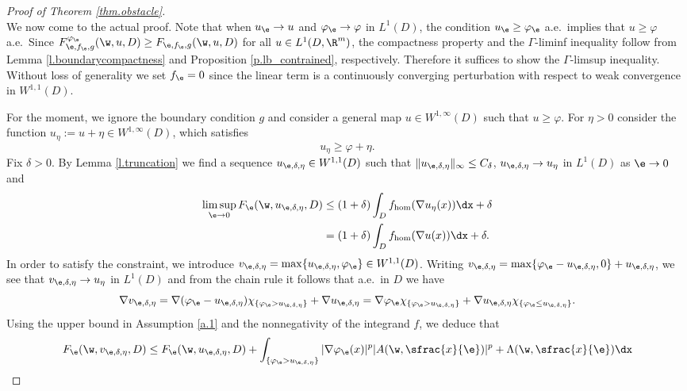 \begin{proof}[Proof of Theorem \ref{thm.obstacle}]
\begin{equation}
\end{equation}
We now come to the actual proof. Note that when $u_{\e}\to u$ and $\varphi_{\e}\to\varphi$ in $L^1(D)$, the condition $u_{\e}\geq \varphi_{\e}$ a.e.\ implies that $u\geq\varphi$ a.e.\ Since $F_{\e,f_{\e},g}^{\varphi_{\e}}(\w,u,D)\geq F_{\e,f_{\e},g}(\w,u,D)$ for all $u\in L^1(D,\R^m)$, the compactness property and the $\Gamma$-liminf inequality follow from Lemma \ref{l.boundarycompactness} and Proposition \ref{p.lb_contrained}, respectively. Therefore it suffices to show the $\Gamma$-limsup inequality. Without loss of generality we set $f_{\e}=0$ since the linear term is a continuously converging perturbation with respect to weak convergence in $W^{1,1}(D)$.

For the moment, we ignore the boundary condition $g$ and consider a general map $u\in W^{1,\infty}(D)$ such that $u\geq \varphi$. For $\eta>0$ consider the function $u_{\eta}:=u+\eta\in W^{1,\infty}(D)$, which satisfies
\begin{equation}\label{eq:eta_barrier}
u_{\eta}\geq \varphi+\eta.
\end{equation}
Fix $\delta>0$. By Lemma \ref{l.truncation} we find a sequence $u_{\e,\delta,\eta}\in W^{1,1}(D)$ such that $\|u_{\e,\delta,\eta}\|_{\infty}\leq C_{\delta}$, $u_{\e,\delta,\eta}\to u_{\eta}$ in $L^1(D)$ as $\e\to 0$ and
\begin{align*}
\limsup_{\e\to 0}F_{\e}(\w,u_{\e,\delta,\eta},D)&\leq(1+\delta)\int_D f_{\hom}(\nabla u_{\eta}(x))\dx+\delta
\\
&=(1+\delta)\int_D f_{\hom}(\nabla u(x))\dx+\delta.
\end{align*}
In order to satisfy the constraint, we introduce $v_{\e,\delta,\eta}=\max\{u_{\e,\delta,\eta},\varphi_{\e}\}\in W^{1,1}(D)$. Writing $v_{\e,\delta,\eta}=\max\{\varphi_{\e}-u_{\e,\delta,\eta},0\}+u_{\e,\delta,\eta}$, we see that $v_{\e,\delta,\eta}\to u_{\eta}$ in $L^1(D)$ and from the chain rule it follows that a.e.\ in $D$ we have
\begin{equation*}
\nabla v_{\e,\delta,\eta}=\nabla(\varphi_{\e}-u_{\e,\delta,\eta})\chi_{\{\varphi_{\e}>u_{\e,\delta,\eta}\}}+\nabla u_{\e,\delta,\eta}=\nabla\varphi_{\e}\chi_{\{\varphi_{\e}>u_{\e,\delta,\eta}\}}+\nabla u_{\e,\delta,\eta}\chi_{\{\varphi_{\e}\leq u_{\e,\delta,\eta}\}}.
\end{equation*}
Using the upper bound in Assumption \ref{a.1} and the nonnegativity of the integrand $f$, we deduce that
\begin{multline*}
F_{\e}(\w,v_{\e,\delta,\eta},D)\leq F_{\e}(\w,u_{\e,\delta,\eta},D)+\int_{\{\varphi_{\e}> u_{\e,\delta,\eta}\}} |\nabla \varphi_{\e}(x)|^p|A(\w,\sfrac{x}{\e})|^p+\Lambda(\w,\sfrac{x}{\e})\dx

\end{multline*}
\end{proof}
